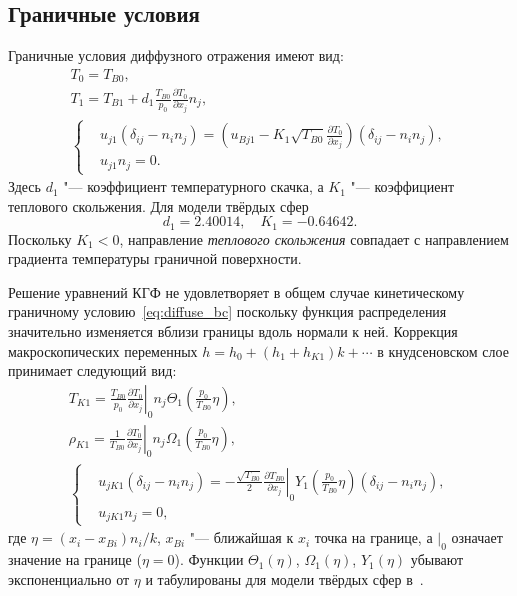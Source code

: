 \documentclass[
aps,%
12pt,%
final,%
notitlepage,%
oneside,%
onecolumn,%
nobibnotes,%
nofootinbib,%
superscriptaddress,%
noshowpacs,%
showkeys,%
centertags]%
{revtex4}
\newcommand{\pder}[2][]{\frac{\partial#1}{\partial#2}}
\begin{document}
\subsection{Граничные условия}

Граничные условия диффузного отражения имеют вид:
\begin{gather}
    T_0 = T_{B0}, \label{eq:bc_T0} \\
    T_1 = T_{B1} + d_1\frac{T_{B0}}{p_0}\pder[T_0]{x_j} n_j, \label{eq:bc_T1} \\
    \left\{
    \begin{aligned}
        & u_{j1} (\delta_{ij}-n_in_j) =
            \left(u_{Bj1} - K_1 \sqrt{T_{B0}} \pder[T_0]{x_j}\right) (\delta_{ij}-n_in_j), \\
        & u_{j1} n_j = 0.
    \end{aligned}
    \right. \label{eq:bc_u1}
\end{gather}
Здесь \(d_1\) "--- коэффициент температурного скачка, а \(K_1\) "--- коэффициент теплового скольжения.
Для модели твёрдых сфер~\cite{Ohwada1989creep, Ohwada1989jump, Takata2015}
\begin{equation}\label{eq:slip_coefficients}
    d_1 = 2.40014, \quad K_1 = -0.64642.
\end{equation}
Поскольку \(K_1<0\), направление \emph{теплового скольжения} совпадает
с направлением градиента температуры граничной поверхности.

Решение уравнений КГФ не удовлетворяет в общем случае кинетическому граничному условию~\eqref{eq:diffuse_bc}
поскольку функция распределения значительно изменяется вблизи границы вдоль нормали к ней.
Коррекция макроскопических переменных \(h = h_0 + (h_1 + h_{K1})k + \cdots\) в кнудсеновском слое
принимает следующий вид:
\begin{gather}
    T_{K1} = \frac{T_{B0}}{p_0}\left.\pder[T_0]{x_j}\right|_0 n_j
        \Theta_1\left(\frac{p_0}{T_{B0}}\eta\right), \label{eq:correction_T} \\
    \rho_{K1} = \frac1{T_{B0}}\left.\pder[T_0]{x_j}\right|_0 n_j
        \Omega_1\left(\frac{p_0}{T_{B0}}\eta\right), \label{eq:correction_rho} \\
    \left\{
    \begin{aligned}
        & u_{jK1} (\delta_{ij}-n_in_j) =
            -\frac{\sqrt{T_{B0}}}2 \left.\pder[T_{B0}]{x_j}\right|_0
            Y_1\left(\frac{p_0}{T_{B0}}\eta\right) (\delta_{ij}-n_in_j), \\
        & u_{jK1} n_j = 0,
    \end{aligned}
    \right. \label{eq:correction_u}
\end{gather}
где \(\eta = (x_i-x_{Bi})n_i/k\), \(x_{Bi}\) "--- ближайшая к \(x_i\) точка на границе,
а \(|_0\) означает значение на границе (\(\eta=0\)).
Функции \(\Theta_1(\eta)\), \(\Omega_1(\eta)\), \(Y_1(\eta)\) убывают экспоненциально от \(\eta\)
и табулированы для модели твёрдых сфер в~\cite{Ohwada1989creep, Ohwada1989jump, Sone2002, Sone2007, Takata2015}.
\end{document}

